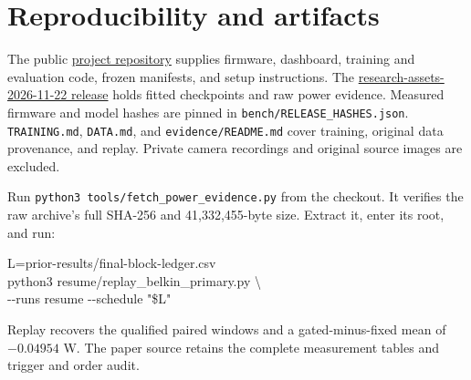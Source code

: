 \documentclass[10pt,letterpaper,twocolumn]{article}
\begin{document}
\section*{Reproducibility and artifacts}
The public \href{https://github.com/sophiayuanproj/FaceRecognition}{project repository} supplies firmware, dashboard, training and evaluation code, frozen manifests, and setup instructions. The \href{https://github.com/sophiayuanproj/FaceRecognition/releases/tag/research-assets-2026-11-22}{research-assets-2026-11-22 release} holds fitted checkpoints and raw power evidence. Measured firmware and model hashes are pinned in \texttt{bench/RELEASE\_HASHES.json}. \texttt{TRAINING.md}, \texttt{DATA.md}, and \texttt{evidence/README.md} cover training, original data provenance, and replay. Private camera recordings and original source images are excluded.

Run \texttt{python3 tools/fetch\_power\_evidence.py} from the checkout. It verifies the raw archive's full SHA-256 and 41{,}332{,}455-byte size. Extract it, enter its root, and run:
\par\noindent\begin{minipage}{\linewidth}
\begin{flushleft}\footnotesize\ttfamily
L=prior-results/final-block-ledger.csv\\
python3 resume/replay\_belkin\_primary.py \textbackslash\\
\hspace*{1em}-{}-runs resume -{}-schedule "\$L"
\end{flushleft}
\end{minipage}\par
Replay recovers the qualified paired windows and a gated-minus-fixed mean of \(-0.04954\) W. The paper source retains the complete measurement tables and trigger and order audit.

{\footnotesize


}
\end{document}
